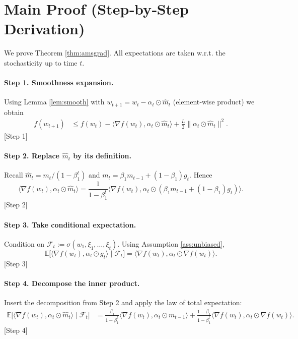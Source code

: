 \documentclass{article}
\begin{document}
\section*{Main Proof (Step‑by‑Step Derivation)}
We prove Theorem \ref{thm:amsgrad}. All expectations are taken w.r.t. the stochasticity up to time $t$.

\paragraph{Step 1. Smoothness expansion.}
Using Lemma \ref{lem:smooth} with $w_{t+1}=w_{t}-\alpha_{t}\odot\hat m_{t}$ (element‑wise product) we obtain
\[
\begin{aligned}
f(w_{t+1}) &\le f(w_{t})-\langle\nabla f(w_{t}),\alpha_{t}\odot\hat m_{t}\rangle
+\frac{L}{2}\|\alpha_{t}\odot\hat m_{t}\|^{2}. \tag{1}
\end{aligned}
\] 
[Step 1]

\paragraph{Step 2. Replace $\hat m_{t}$ by its definition.}
Recall $\hat m_{t}=m_{t}/(1-\beta_{1}^{t})$ and $m_{t}=\beta_{1}m_{t-1}+(1-\beta_{1})g_{t}$. Hence
\[
\langle\nabla f(w_{t}),\alpha_{t}\odot\hat m_{t}\rangle
=\frac{1}{1-\beta_{1}^{t}}\langle\nabla f(w_{t}),\alpha_{t}\odot(\beta_{1}m_{t-1}+(1-\beta_{1})g_{t})\rangle.
\] 
[Step 2]

\paragraph{Step 3. Take conditional expectation.}
Condition on $\mathcal{F}_{t}:=\sigma(w_{1},\xi_{1},\dots,\xi_{t})$. Using Assumption \ref{ass:unbiased},
\[
\mathbb{E}\!\bigl[\langle\nabla f(w_{t}),\alpha_{t}\odot g_{t}\rangle\mid\mathcal{F}_{t}\bigr]
=\langle\nabla f(w_{t}),\alpha_{t}\odot\nabla f(w_{t})\rangle.
\] 
[Step 3]

\paragraph{Step 4. Decompose the inner product.}
Insert the decomposition from Step 2 and apply the law of total expectation:
\[
\begin{aligned}
\mathbb{E}\!\bigl[\langle\nabla f(w_{t}),\alpha_{t}\odot\hat m_{t}\rangle\mid\mathcal{F}_{t}\bigr]
&=\frac{\beta_{1}}{1-\beta_{1}^{t}}\langle\nabla f(w_{t}),\alpha_{t}\odot m_{t-1}\rangle
+\frac{1-\beta_{1}}{1-\beta_{1}^{t}}\langle\nabla f(w_{t}),\alpha_{t}\odot\nabla f(w_{t})\rangle.
\end{aligned}
\] 
[Step 4]
\end{document}
